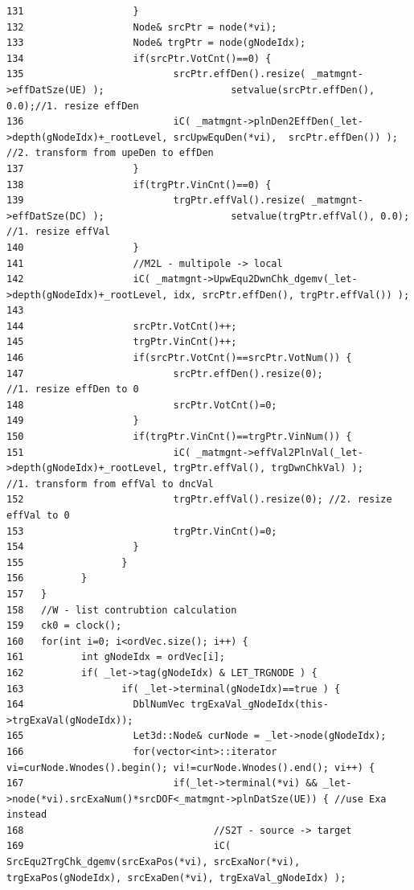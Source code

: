 \begin{verbatim}
131                   }
132                   Node& srcPtr = node(*vi);
133                   Node& trgPtr = node(gNodeIdx);
134                   if(srcPtr.VotCnt()==0) {
135                          srcPtr.effDen().resize( _matmgnt->effDatSze(UE) );                      setvalue(srcPtr.effDen(), 0.0);//1. resize effDen
136                          iC( _matmgnt->plnDen2EffDen(_let->depth(gNodeIdx)+_rootLevel, srcUpwEquDen(*vi),  srcPtr.effDen()) );                   //2. transform from upeDen to effDen
137                   }
138                   if(trgPtr.VinCnt()==0) {
139                          trgPtr.effVal().resize( _matmgnt->effDatSze(DC) );                      setvalue(trgPtr.effVal(), 0.0);                         //1. resize effVal
140                   }
141                   //M2L - multipole -> local
142                   iC( _matmgnt->UpwEqu2DwnChk_dgemv(_let->depth(gNodeIdx)+_rootLevel, idx, srcPtr.effDen(), trgPtr.effVal()) );
143                   
144                   srcPtr.VotCnt()++;
145                   trgPtr.VinCnt()++;
146                   if(srcPtr.VotCnt()==srcPtr.VotNum()) {
147                          srcPtr.effDen().resize(0);                      //1. resize effDen to 0
148                          srcPtr.VotCnt()=0;
149                   }
150                   if(trgPtr.VinCnt()==trgPtr.VinNum()) {
151                          iC( _matmgnt->effVal2PlnVal(_let->depth(gNodeIdx)+_rootLevel, trgPtr.effVal(), trgDwnChkVal) );                         //1. transform from effVal to dncVal
152                          trgPtr.effVal().resize(0); //2. resize effVal to 0
153                          trgPtr.VinCnt()=0;
154                   }
155                 }
156          }
157   }
158   //W - list contrubtion calculation
159   ck0 = clock();
160   for(int i=0; i<ordVec.size(); i++) {
161          int gNodeIdx = ordVec[i];
162          if( _let->tag(gNodeIdx) & LET_TRGNODE ) {
163                 if( _let->terminal(gNodeIdx)==true ) {
164                   DblNumVec trgExaVal_gNodeIdx(this->trgExaVal(gNodeIdx));
165                   Let3d::Node& curNode = _let->node(gNodeIdx);
166                   for(vector<int>::iterator vi=curNode.Wnodes().begin(); vi!=curNode.Wnodes().end(); vi++) {
167                          if(_let->terminal(*vi) && _let->node(*vi).srcExaNum()*srcDOF<_matmgnt->plnDatSze(UE)) { //use Exa instead
168                                 //S2T - source -> target
169                                 iC( SrcEqu2TrgChk_dgemv(srcExaPos(*vi), srcExaNor(*vi), trgExaPos(gNodeIdx), srcExaDen(*vi), trgExaVal_gNodeIdx) );

\end{verbatim}
